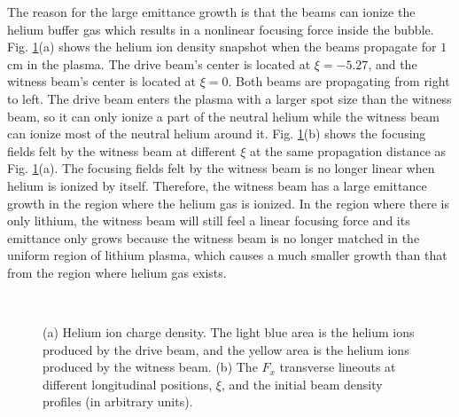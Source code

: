 \documentclass[%
reprint, superscriptaddress,
 amsmath,amssymb, aps,
prstab,
]{revtex4-2}
\begin{document}
The reason for the large emittance growth is that
        the beams can ionize the helium buffer gas which results in a
        nonlinear focusing force inside the bubble.
        Fig. \ref{fig:HICD_and_focus_x}(a)  shows the helium ion density
        snapshot when the beams propagate for $1$ cm in the plasma. The
        drive beam's center is located at  $\xi = -5.27$, and the
        witness beam's center is located at $\xi = 0$. Both beams are propagating from right to left. The drive beam
        enters the plasma with a larger spot size than the witness beam,
        so it can only ionize a part of the neutral helium while the
        witness beam can ionize most of the neutral helium around it.
        Fig. \ref{fig:HICD_and_focus_x}(b) shows the focusing fields felt
        by the witness beam at different $\xi$ at the same propagation
        distance as Fig. \ref{fig:HICD_and_focus_x}(a). The focusing
        fields felt by the witness beam is no longer linear when
        helium is ionized by itself. Therefore, the witness beam has a
        large emittance growth in the region where the helium gas is
        ionized. In the region where there is only lithium, the witness
        beam will still feel a linear focusing force and its emittance
        only grows because the witness beam is no longer matched in the
        uniform region of lithium plasma, which causes a much smaller growth than that from the region where helium gas exists.
        \begin{figure}[htbp] 
    \\
    \caption{(a) Helium ion charge density. The light blue area is the
    helium ions produced by the drive beam, and the yellow area is the
    helium ions produced by the witness beam. (b) The $F_x$ transverse
    lineouts at different longitudinal positions, $\xi$, and the initial
    beam density profiles (in arbitrary units).} \label{fig:HICD_and_focus_x} \end{figure}
\end{document}
